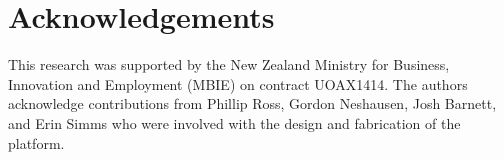 \documentclass[preprint,authoryear,12pt]{elsarticle}
\begin{document}
\section*{Acknowledgements}
This research was supported by the New Zealand Ministry for Business, Innovation and Employment (MBIE) on contract UOAX1414.
The authors acknowledge contributions from Phillip Ross, Gordon Neshausen, Josh Barnett, and Erin Simms who were involved with the design and fabrication of the platform.




\end{document}
